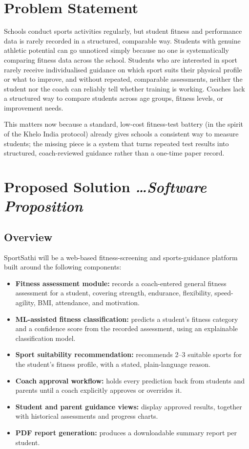 \documentclass[11pt,a4paper]{article}
\newcommand{\BvrHint}[1]{%
  {\normalfont\normalsize\itshape\hfill #1}}
\begin{document}
\section{Problem Statement}
Schools conduct sports activities regularly, but student
fitness and performance data is rarely recorded in a
structured, comparable way. Students with genuine athletic
potential can go unnoticed simply because no one is
systematically comparing fitness data across the school.
Students who are interested in sport rarely receive
individualised guidance on which sport suits their
physical profile or what to improve, and without repeated,
comparable assessments, neither the student nor the coach
can reliably tell whether training is working. Coaches
lack a structured way to compare students across age
groups, fitness levels, or improvement needs.

This matters now because a standard, low-cost fitness-test
battery (in the spirit of the Khelo India protocol)
already gives schools a consistent way to measure
students; the missing piece is a system that turns
repeated test results into structured, coach-reviewed
guidance rather than a one-time paper record.

\section{Proposed Solution %
\BvrHint{\ldots Software Proposition}}
\subsection{Overview}
SportSathi will be a web-based fitness-screening and
sports-guidance platform built around the following
components:
\begin{itemize}[leftmargin=0.7cm]
    \item \textbf{Fitness assessment module:} records a coach-entered general fitness assessment for a student, covering strength, endurance, flexibility, speed-agility, BMI, attendance, and motivation.
    \item \textbf{ML-assisted fitness classification:} predicts a student's fitness category and a confidence score from the recorded assessment, using an explainable classification model.
    \item \textbf{Sport suitability recommendation:} recommends 2--3 suitable sports for the student's fitness profile, with a stated, plain-language reason.
    \item \textbf{Coach approval workflow:} holds every prediction back from students and parents until a coach explicitly approves or overrides it.
    \item \textbf{Student and parent guidance views:} display approved results, together with historical assessments and progress charts.
    \item \textbf{PDF report generation:} produces a downloadable summary report per student.
\end{itemize}
\end{document}
